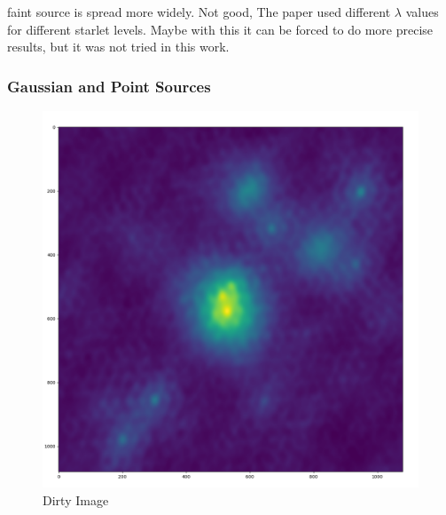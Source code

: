 faint source is spread more widely. Not good, The paper \cite{starck2015starlet} used different $\lambda$ values for different starlet levels. Maybe with this it can be forced to do more precise results, but it was not tried in this work.

\subsubsection{Gaussian and Point Sources}

\begin{figure}[h]
	\centering
	\includegraphics[width=0.5\linewidth]{./chapters/05.algorithms/results/sim00_mixed_sources_dirty.png}
	\caption{Dirty Image}
	\label{alg:gauss:dirty}
\end{figure}

